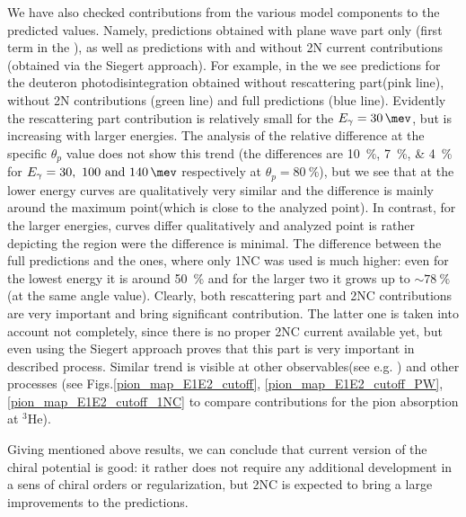 We have also checked contributions from the various model components to the predicted values.
Namely, predictions obtained with plane wave part only (first term in the ),
as well as predictions with and without 2N current contributions (obtained via the Siegert approach).
For example, in the  we see predictions for the deuteron photodisintegration obtained 
without rescattering part(pink line), without 2N contributions (green line) and full predictions (blue line).
Evidently the rescattering part contribution is relatively small for the $E_\gamma = \SI{30}{\mev}$,
but is increasing with larger energies. The analysis of the relative difference at the specific 
$\theta_p$ value does not show this trend (the differences are \SIlist{10;7;4}{\percent} 
for $E_\gamma=\SIlist[list-units = single]{30;100;140}{\mev}$ respectively at $\theta_p=\SI{80}{\percent}$), but we see that
at the lower energy curves are qualitatively very similar and the difference is mainly around the maximum point(which is close to the analyzed point).
In contrast, for the larger energies, curves differ qualitatively and analyzed point is rather depicting the region
were the difference is minimal.
The difference between the full predictions and the ones, where only 1NC was used is much higher:
even for the lowest energy it is around \SI{50}{\percent} and for the larger two it grows
up to $\sim\SI{78}{\percent}$ (at the same angle value).
Clearly, both rescattering part and 2NC contributions are very important and bring significant contribution.
The latter one is taken into account not completely, since there is no proper 2NC current 
available yet, but even using the Siegert approach proves that this part is very important in described process.
Similar trend is visible at other observables(see e.g. ) and other processes 
(see Figs.\ref{pion_map_E1E2_cutoff}, \ref{pion_map_E1E2_cutoff_PW}, \ref{pion_map_E1E2_cutoff_1NC}
to compare contributions for the pion absorption at $^3$He).

Giving mentioned above results, we can conclude that current version of the chiral potential is good:
it rather does not require any additional development in a sens of chiral orders or regularization,
but 2NC is expected to bring a large improvements to the predictions.

